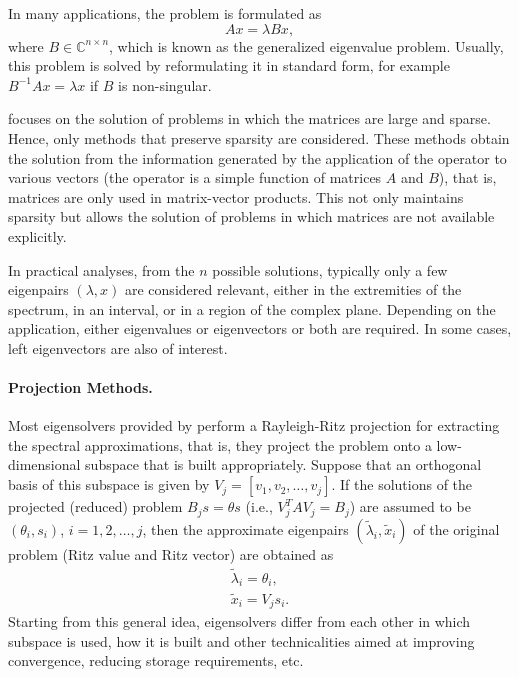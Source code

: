 	In many applications, the problem is formulated as 
\begin{equation}
Ax=\lambda Bx,\label{eq:eiggen}
\end{equation}
where $B\in\mathbb{C}^{n\times n}$, which is known as the generalized eigenvalue problem. Usually, this problem is solved by reformulating it in standard form, for example $B^{-1}Ax=\lambda x$ if $B$ is non-singular.

	\slepc focuses on the solution of problems in which the matrices are large and sparse. Hence, only methods that preserve sparsity are considered.
	These methods obtain the solution from the information generated by the application of the operator to various vectors (the operator is a simple function of matrices $A$ and $B$), that is, matrices are only used in matrix-vector products. This not only maintains sparsity but allows the solution of problems in which matrices are not available explicitly.

In practical analyses, from the $n$ possible solutions, typically only a few eigenpairs $(\lambda,x)$ are considered relevant, either in the extremities of the spectrum, in an interval, or in a region of the complex plane.
Depending on the application, either eigenvalues or eigenvectors or both are required. In some cases, left eigenvectors are also of interest.
	
\paragraph{Projection Methods.}

	Most eigensolvers provided by \slepc perform a Rayleigh-Ritz projection for extracting the spectral approximations, that is, they project the problem onto a low-dimensional subspace that is built appropriately. Suppose that an orthogonal basis of this subspace is given by $V_j=[v_1,v_2,\ldots,v_j]$. If the solutions of the projected (reduced) problem $B_js=\theta s$ (i.e., $V_j^TAV_j=B_j$) are assumed to be $(\theta_i,s_i)$, $i=1,2,\ldots,j$, then the approximate eigenpairs $(\tilde{\lambda}_i,\tilde{x}_i)$ of the original problem (Ritz value and Ritz vector) are obtained as
\begin{eqnarray}
\tilde{\lambda}_i=\theta_i,\\
\tilde{x}_i=V_js_i.
\end{eqnarray}
Starting from this general idea, eigensolvers differ from each other in which subspace is used, how it is built and other technicalities aimed at improving convergence, reducing storage requirements, etc.

